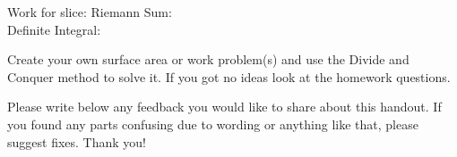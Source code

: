 \documentclass[answers]{exam}
\begin{document}
\begin{questions}
Work for slice: \hspace{2in} Riemann Sum:\\

Definite Integral: \\

\vfill

\newpage

\question Create your own surface area or work problem(s) and use the Divide and Conquer method to solve it. If you got no ideas look at the homework questions.

\vspace{7in}

\question Please write below any feedback you would like to share about this handout. If you found any parts confusing due to wording or anything like that, please suggest fixes. Thank you!

\end{questions}
\end{document}
